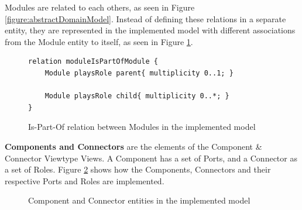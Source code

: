 \documentclass{llncs}
\begin{document}
Modules are related to each others, as seen in Figure \ref{figure:abstractDomainModel}. Instead of defining these relations in a separate entity, they are represented in the implemented model with different associations from the Module entity to itself, as seen in Figure \ref{figure:modelIsPartOfRelation}.

\begin{figure}
\centering
\lstset{style=customjava}
\begin{lstlisting}
relation moduleIsPartOfModule {
	Module playsRole parent{ multiplicity 0..1; }
	
	Module playsRole child{ multiplicity 0..*; }
}
\end{lstlisting}
\caption{Is-Part-Of relation between Modules in the implemented model}
\label{figure:modelIsPartOfRelation}
\end{figure}

\textbf{Components and Connectors} are the elements of the Component \& Connector Viewtype Views. A Component has a set of Ports, and a Connector as a set of Roles. Figure \ref{figure:modelComponentConnector} shows how the Components, Connectors and their respective Ports and Roles are implemented.
\begin{figure}
\centering
\renewcommand {\umltextcolor}{black}
\renewcommand {\umlfillcolor}{none}
\renewcommand {\umldrawcolor}{black}
\caption{Component and Connector entities in the implemented model}
\label{figure:modelComponentConnector}
\end{figure}
\end{document}
